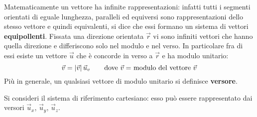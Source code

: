 \documentclass[10pt,a4paper]{book}
\DeclarePairedDelimiter{\abs}{\lvert}{\rvert} %
\begin{document}
Matematicamente un vettore ha infinite rappresentazioni: infatti tutti i segmenti orientati di eguale lunghezza, paralleli ed equiversi sono rappresentazioni dello stesso vettore e quindi equivalenti, si dice che essi formano un sistema di vettori \textbf{equipollenti}. Fissata una direzione orientata $\vec{r}$ vi sono infiniti vettori che hanno quella direzione e differiscono solo nel modulo e nel verso. In particolare fra di essi esiste un vettore $\vec{u}$ che è concorde in verso a $\vec{r}$ e ha modulo unitario:
\[
	\vec{v}=\abs{\vec{v}} \,\vec{u}_v \qquad \text{dove $\vec{v}=$ modulo del vettore $\vec{v}$}
\]
Più in generale, un qualsiasi vettore di modulo unitario si definisce \textbf{versore}.

Si consideri il sistema di riferimento cartesiano: esso può essere rappresentato dai versori $\vec{u}_x$, $\vec{u}_y$, $\vec{u}_z$.
\end{document}
